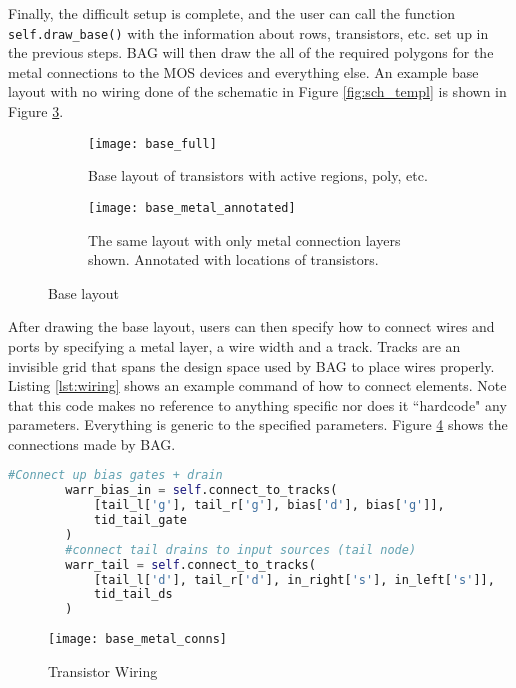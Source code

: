 \clearpage
Finally, the difficult setup is complete, and the user can call the function \texttt{self.draw\_base()} with the information about rows, transistors, etc. set up in the previous steps. BAG will then draw the all of the required polygons for the metal connections to the MOS devices and everything else. An example base layout with no wiring done of the schematic in Figure \ref{fig:sch_templ} is shown in Figure \ref{fig:base_layout_metal}.
\begin{figure}[h]
\centering
\begin{subfigure}{.4\linewidth}
  \centering
  \texttt{[image: base\_full]}
  \caption{Base layout of transistors with active regions, poly, etc.}
  \label{fig:sfig1}
\end{subfigure}
\begin{subfigure}{.4\linewidth}
  \centering
\texttt{[image: base\_metal\_annotated]}
  \caption{The same layout with only metal connection layers shown. Annotated with locations of transistors.}
  \label{fig:sfig2}
\end{subfigure}
\caption{Base layout}
\label{fig:base_layout_metal}
\end{figure}
\clearpage
After drawing the base layout, users can then specify how to connect wires and ports by specifying a metal layer, a wire width and a track. Tracks are an invisible grid that spans the design space used by BAG to place wires properly. Listing \ref{lst:wiring} shows an example command of how to connect elements. Note that this code makes no reference to anything specific nor does it ``hardcode" any parameters. Everything is generic to the specified parameters. Figure \ref{fig:base_with_wires} shows the connections made by BAG.
\begin{lstlisting}[language=Python, caption=Drawing wire connections, label={lst:wiring}, float]
	      #Connect up bias gates + drain
        warr_bias_in = self.connect_to_tracks(
            [tail_l['g'], tail_r['g'], bias['d'], bias['g']],
            tid_tail_gate
        )
        #connect tail drains to input sources (tail node)
        warr_tail = self.connect_to_tracks(
            [tail_l['d'], tail_r['d'], in_right['s'], in_left['s']],
            tid_tail_ds
        )
\end{lstlisting}
\begin{figure}[h]
\centering
\texttt{[image: base\_metal\_conns]}
\caption{Transistor Wiring}
\label{fig:base_with_wires}
\end{figure}

